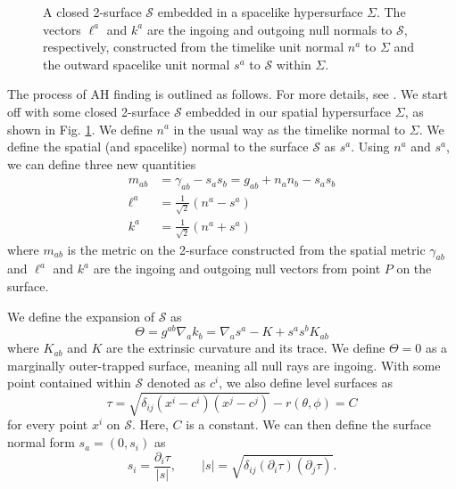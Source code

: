 \begin{bibunit}[unsrtnat]
\begin{figure}[htb]
   \caption[Null normals to a closed 2-surface (apparent horizon).]{A closed
      2-surface $\mathcal{S}$ embedded in a spacelike hypersurface $\Sigma$. The
      vectors $\ell^a$ and $k^a$ are the ingoing and outgoing null normals to
      $\mathcal{S}$, respectively, constructed from the timelike unit normal
      $n^a$ to $\Sigma$ and the outward spacelike unit normal $s^a$ to
      $\mathcal{S}$ within $\Sigma$.}
   \label{fig:apparent_horizon_normals}
\end{figure}

The process of AH finding is outlined as follows. For more details, see
\cite{Gundlach:1997us}. We start off with some closed 2-surface $\mathcal{S}$
embedded in our spatial hypersurface $\Sigma$, as shown in Fig.
\ref{fig:apparent_horizon_normals}. We define $n^a$ in the usual way as the
timelike normal to $\Sigma$. We define the spatial (and spacelike) normal to the
surface $\mathcal{S}$ as $s^a$. Using $n^a$ and $s^a$, we can define three new
quantities
\begin{align}
   m_{ab} &= \gamma_{ab} -s_as_b = g_{ab} + n_an_b - s_as_b \\
   \ell^a &= \frac{1}{\sqrt{2}}(n^a-s^a) \\
   k^a &= \frac{1}{\sqrt{2}}(n^a+s^a)
\end{align}
where $m_{ab}$ is the metric on the 2-surface constructed from the spatial
metric $\gamma_{ab}$ and $\ell^a$ and $k^a$ are the ingoing and outgoing null
vectors from point $P$ on the surface.

We define the expansion of $\mathcal{S}$ as
\begin{equation}
   \Theta = g^{ab}\nabla_a k_b = \nabla_a s^a - K + s^as^bK_{ab} \label{eq:ah_expansion}
\end{equation}
where $K_{ab}$ and $K$ are the extrinsic curvature and its trace. We define
$\Theta=0$ as a marginally outer-trapped surface, meaning all null rays are
ingoing. With some point contained within $\mathcal{S}$ denoted as $c^i$, we
also define level surfaces as
\begin{equation}
   \tau = \sqrt{\delta_{ij}(x^i-c^i)(x^j-c^j)} - r(\theta,\phi) = C
\end{equation}
for every point $x^i$ on $\mathcal{S}$. Here, $C$ is a constant. We can then
define the surface normal form $s_a=(0,s_i)$ as
\begin{equation}
   s_i = \frac{\partial_i \tau}{|s|}, \quad\quad
   |s| = \sqrt{\delta_{ij}(\partial_i\tau)(\partial_j\tau)}.
\end{equation}


\end{bibunit}
